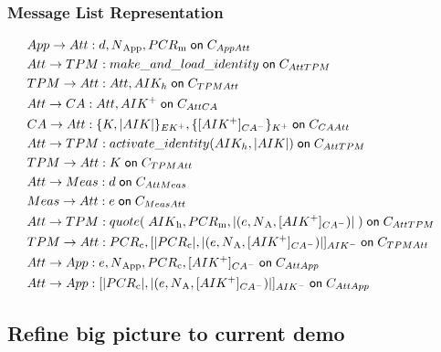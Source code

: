 \documentclass{beamer}
\def \pmask {PCR\textsubscript{m}}
\def \pcomp {PCR\textsubscript{c}}
\def \evd {d}
\def \eve {e}
\def \cacert {\sign {\public{AIK}}{CA}}
\def \exdata {\hash{(\eve, \nonce{A}, \cacert ) }}
\def \aikh {AIK_h}
\def \app {App}
\def \att {Att}
\def \ca {CA}
\def \mea {Meas}
\def \tp {TPM}
\begin{document}
\begin{frame}
  \frametitle{Message List Representation}
  \begin{small}
  \begin{align*}
  & \sndmsg {\app}{\att} {\evd, \nonce{\app}, \pmask} {\channel {\app \att}}  & \\
  & \sndmsg{\att}{\tp} {make\_and\_load\_identity} {\channel {\att \tp}} & \\
  & \sndmsg{\tp}{\att} {\att, \aikh} {\channel {\tp \att}} & \\
  & \sndmsg{\att}{\ca} {\att, \public{AIK}} {\channel {\att \ca}} & \\
  & \sndmsg{\ca}{\att} {\encrypt{K, \hash{AIK}}{EK}, \encrypt{\cacert}{K}} {\channel {\ca \att}}& \\
  & \sndmsg{\att}{\tp} {activate\_identity({\aikh, \hash{AIK})}} {\channel {\att \tp}} & \\
  & \sndmsg{\tp}{\att} {K} {\channel {\tp \att}} & \\
  & \sndmsg{\att}{\mea} {\evd} {\channel {\att \mea}} & \\
  & \sndmsg{\mea}{\att} {\eve} {\channel {\mea \att}} & \\
  & \sndmsg{\att}{\tp} {quote(\;{AIK\textsubscript{h}, \pmask, \exdata}\;)} {\channel {\att \tp}} & \\
  & \sndmsg{\tp}{\att} {\pcomp, \sign{\hash{\pcomp}, \exdata}{AIK}} {\channel {\tp \att}} & \\
  & \sndmsg{\att}{\app} {\eve, \nonce{\app}, \pcomp, \cacert} {\channel {\att \app}} & \\
  & \sndmsg{\att}{\app} {\sign{\hash{\pcomp}, \exdata}{AIK}} {\channel {\att \app}} & 
\end{align*}
\end{small}
\end{frame}

\subsection{Refine big picture to current demo}
\end{document}
